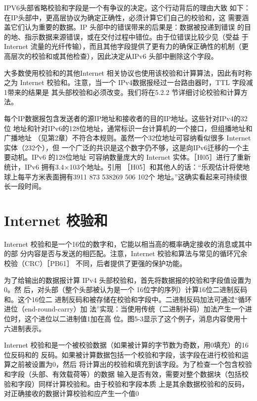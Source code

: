 \begin{tcolorbox}
  IPV6头部省略校验和字段是一个有争议的决定。这个行动背后的理由大致
  如下：在IP头部中，更高层协议为确定正确性，必须计算它们自己的校验和，这
  需要涵盖它们认为重要的数据。IP 头部中的错误带来的后果是：数据被投递到错误
  的目的地、指示数据来源错误，或在交付过程中错位。由于位错误比较少见（受益
  于 Internet 流量的光纤传输），而且其他字段提供了更有力的确保正确性的机制（更
  高层次的校验和或其他检查），因此决定从IPv6 头部中删除这个字段。
\end{tcolorbox}

大多数使用校验和的其他Internet 相关协议也使用该校验和计算算法，因此有时称之为
Internet 校验和。注意，当一个 IPv4数据报经过一台路由器时，TTL 字段减1带来的结果是
其头部校验和必须改变。我们将在5.2.2 节详细讨论校验和计算方法。

每个IP数据报包含发送者的源IP地址和接收者的目的IP地址。这些针对IPv4的32位
地址和针对IPv6的128位地址，通常标识一台计算机的一个接口，但组播地址和广播地址
（见第2章）不符合本规则。虽然一个32位地址可容纳看似很多 Internet 实体（232个），但
一个广泛的共识是这个数字仍不够，这是向IPv6迁移的一个主要动机。IPv6 的128位地址
可容纳数量庞大的 Internet 实体。［H05］进行了重新统计，IPv6 拥有3.4×103个地址。引用
［H05］和其他人的话：“乐观估计将使地球上每平方米表面拥有3911 873 538269 506 102个
地址。”这确实看起来可持续很长一段时间。

\section{Internet 校验和}

Internet 校验和是一个16位的数字和，它能以相当高的概率确定接收的消息或其中的部
分内容是否与发送的相匹配。注意，Internet 校验和算法与常见的循环冗余校验（CRC）［PB61］
不同，后者提供了更强的保护功能。

为了给输出的数据报计算 IPv4 头部校验和，首先将数据报的校验和字段值设置为0。然
后，对头部（整个头部被认为是一个 16位字的序列）计算16位二进制反码和。这个16位二
进制反码和被存储在校验和字段中。二进制反码加法可通过“循环进位（end-round-carry）加
法”实现：当使用传统（二进制补码）加法产生一个进位时，这个进位以二进制值1加在高
位。图5-3显示了这个例子，消息内容使用十六进制表示。

Internet 校验和是一个被校验数据（如果被计算的字节数为奇数，用0填充）的16位反码和的
反码。如果被计算数据包括一个校验和字段，该字段在进行校验和运算之前被设置为0，然后
将计算出的校验和填充到该字段。为了检查一个包含校验和字段（头部、有效载荷等）的数据
输入是否有效，需要对整个数据块（包括校验和字段）同样计算校验和。由于校验和字段本质
上是其余数据校验和的反码，对正确接收的数据计算校验和应产生一个值0

